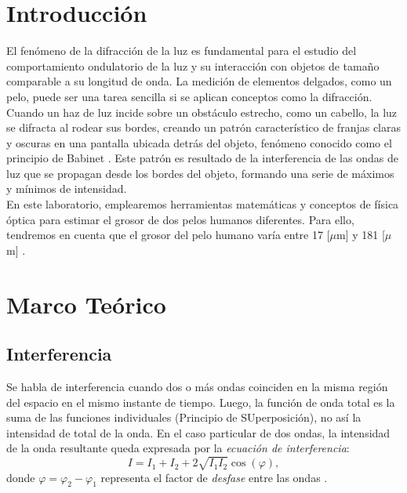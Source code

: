 \documentclass[10pt,a4paper]{article}
\begin{document}
	\begin{multicols}{2}
		\section{Introducción}
		El fenómeno de la difracción de la luz es fundamental para el estudio del comportamiento ondulatorio de la luz y su interacción con objetos de tamaño comparable a su longitud de onda. La medición de elementos delgados, como un pelo, puede ser una tarea sencilla si se aplican conceptos como la difracción.\\
		
		 Cuando un haz de luz incide sobre un obstáculo estrecho, como un cabello, la luz se difracta al rodear sus bordes, creando un patrón característico de franjas claras y oscuras en una pantalla ubicada detrás del objeto, fenómeno conocido como el principio de Babinet \cite{babinet}. Este patrón es resultado de la interferencia de las ondas de luz que se propagan desde los bordes del objeto, formando una serie de máximos y mínimos de intensidad. \\
		
		En este laboratorio, emplearemos herramientas matemáticas y conceptos de física óptica para estimar el grosor de dos pelos humanos diferentes. Para ello, tendremos en cuenta que el grosor del pelo humano varía entre 17 [$\mu$m] y 181 [$\mu$m] \cite{wikiPELO}. 
			
		\section{Marco Teórico}
		\subsection*{Interferencia} 
		Se habla de interferencia cuando dos o más ondas coinciden en la misma región del espacio en el mismo instante de tiempo. Luego, la función de onda total es la suma de las funciones individuales (Principio de SUperposición), no así la intensidad de total de la onda. En el caso particular de dos ondas, la intensidad de la onda resultante queda expresada por la \emph{ecuación de interferencia}:
		\begin{equation}
		I = I_1 + I_2 + 2\sqrt{I_1 I_2} \cos(\varphi),
		\end{equation}
		donde $\varphi = \varphi_2 - \varphi_1$ representa el factor de \emph{desfase} entre las ondas \cite{interferencia}.

\end{multicols}
\end{document}
